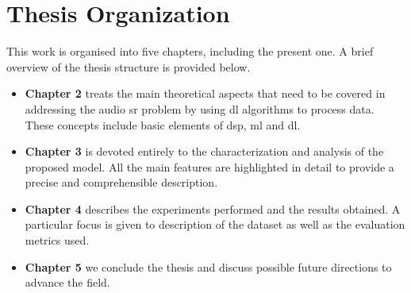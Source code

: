 \section{Thesis Organization}
This work is organised into five chapters, including the present one. A brief overview of the thesis structure is provided below. 
\begin{itemize}
	\item \textbf{Chapter 2} treats the main theoretical aspects that need to be covered in addressing the audio \gls{sr} problem by using \gls{dl} algorithms to process data. These concepts include basic elements of \gls{dsp}, \gls{ml} and \gls{dl}.
	\item \textbf{Chapter 3} is devoted entirely to the characterization and analysis of the proposed model. All the main features are highlighted in detail to provide a precise and comprehensible description. 
	\item \textbf{Chapter 4} describes the experiments performed and the results obtained. A particular focus is given to description of the dataset as well as the evaluation metrics used. 
	\item \textbf{Chapter 5} we conclude the thesis and discuss possible future directions to advance the field.
\end{itemize}
